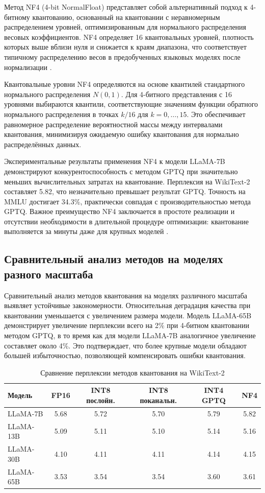 \documentclass[bachelor, och, coursework]{SCWorks}
\begin{document}
	Метод NF4 (4-bit NormalFloat) представляет собой альтернативный подход к 4-битному квантованию, основанный на квантовании с неравномерным распределением уровней, оптимизированным для нормального распределения весовых коэффициентов. NF4 определяет 16 квантовальных уровней, плотность которых выше вблизи нуля и снижается к краям диапазона, что соответствует типичному распределению весов в предобученных языковых моделях после нормализации \cite{nf4}.
	
	Квантовальные уровни NF4 определяются на основе квантилей стандартного нормального распределения \(N(0, 1)\). Для 4-битного представления с 16 уровнями выбираются квантили, соответствующие значениям функции обратного нормального распределения в точках \(k / 16\) для \(k = 0, \dots, 15\). Это обеспечивает равномерное распределение вероятностной массы между интервалами квантования, минимизируя ожидаемую ошибку квантования для нормально распределённых данных.
	
	Экспериментальные результаты применения NF4 к модели LLaMA-7B демонстрируют конкурентоспособность с методом GPTQ при значительно меньших вычислительных затратах на квантование. Перплексия на WikiText-2 составляет 5.82, что незначительно превышает результат GPTQ. Точность на MMLU достигает 34.3\%, практически совпадая с производительностью метода GPTQ. Важное преимущество NF4 заключается в простоте реализации и отсутствии необходимости в длительной процедуре оптимизации: квантование выполняется за минуты даже для крупных моделей \cite{qlora}.
	
	\subsection{Сравнительный анализ методов на моделях разного масштаба}
	
	Сравнительный анализ методов квантования на моделях различного масштаба выявляет устойчивые закономерности. Относительная деградация качества при квантовании уменьшается с увеличением размера модели. Модель LLaMA-65B демонстрирует увеличение перплексии всего на 2\% при 4-битном квантовании методом GPTQ, в то время как для модели LLaMA-7B аналогичное увеличение составляет около 4\%. Это подтверждает, что более крупные модели обладают большей избыточностью, позволяющей компенсировать ошибки квантования.
	
	\begin{table}[!ht]
		\centering
		\small
		\caption{Сравнение перплексии методов квантования на WikiText-2}
		\label{tab:perplexity}
		\begin{tabular}{|l|c|c|c|c|c|}
			\hline
			Модель & FP16 & INT8 послойн. & INT8 поканальн. & INT4 GPTQ & NF4 \\
			\hline
			LLaMA-7B & 5.68 & 5.72 & 5.70 & 5.79 & 5.82 \\
			\hline
			LLaMA-13B & 5.09 & 5.11 & 5.10 & 5.14 & 5.16 \\
			\hline
			LLaMA-30B & 4.10 & 4.11 & 4.11 & 4.14 & 4.15 \\
			\hline
			LLaMA-65B & 3.53 & 3.54 & 3.54 & 3.60 & 3.61 \\
			\hline
		\end{tabular}
	\end{table}
	
\end{document}
